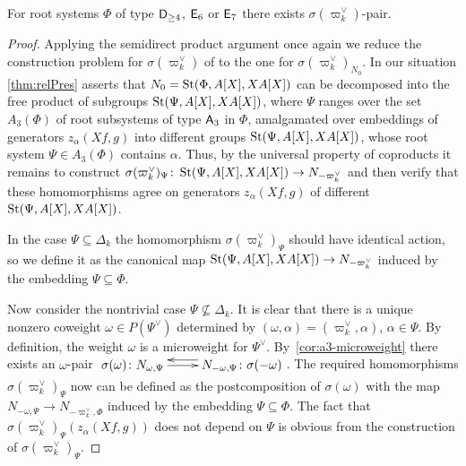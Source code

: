 \begin{thm}
    For root systems $\Phi$ of type $\mathsf{D}_{\geq 4}$, $\mathsf{E}_6$ or $\mathsf{E}_7$ there exists $\sigma(\varpi_k^\vee)$-pair.
\end{thm}
\begin{proof}
    Applying the semidirect product argument once again we reduce the construction problem for $\sigma(\varpi_k^\vee)$ of to the one for $\sigma({\varpi_k^\vee})_{N_0}$.
    In our situation \cref{thm:relPres} asserts that $N_0 = \operatorname{St}(\Phi, A[X], XA[X])$ can be decomposed into the free product of subgroups $\operatorname{St}(\Psi, A[X], XA[X])$,
    where $\Psi$ ranges over the set $A_3(\Phi)$ of root subsystems of type $\mathsf{A}_3$ in $\Phi$, amalgamated over embeddings of generators $z_\alpha(Xf, g)$ into different groups $\operatorname{St}(\Psi, A[X], XA[X])$, whose root system $\Psi \in A_3(\Phi)$ contains $\alpha$.
    Thus, by the universal property of coproducts it remains to construct $\sigma(\varpi_k^\vee)_\Psi \colon \operatorname{St}(\Psi, A[X], XA[X]) \to N_{-\varpi_k^\vee}$ and then
    verify that these homomorphisms agree on generators $z_\alpha(Xf, g)$ of different $\operatorname{St}(\Psi, A[X], XA[X])$.

    In the case $\Psi \subseteq \Delta_k$ the homomorphism $\sigma(\varpi_k^\vee)_\Psi$ should have identical action, so we define it as the canonical map $\operatorname{St}(\Psi, A[X], XA[X]) \to N_{-\varpi_k^\vee}$
    induced by the embedding $\Psi \subseteq \Phi$.

    Now consider the nontrivial case $\Psi \not\subseteq \Delta_k$.
    It is clear that there is a unique nonzero coweight $\omega \in P(\Psi^\vee)$ determined by $(\omega, \alpha) = (\varpi_k^\vee, \alpha)$, $\alpha \in \Psi$.
    By definition, the weight $\omega$ is a microweight for $\Psi^\vee$.
    By~\cref{cor:a3-microweight} there exists an $\omega$-pair $\xymatrix{ \sigma(\omega)\colon N_{\omega, \Psi} \ar[r] & \ar@<-1.0ex>[l] N_{-\omega, \Psi}\colon \sigma(-\omega) }$.
    The required homomorphisms $\sigma(\varpi_k^\vee)_\Psi$ now can be defined as the postcomposition of $\sigma(\omega)$ with the map $N_{-\omega, \Psi} \to N_{-\varpi_k^\vee, \Phi}$ induced by the embedding $\Psi \subseteq \Phi$.
    The fact that $\sigma(\varpi_k^\vee)_\Psi(z_\alpha(Xf, g))$ does not depend on $\Psi$ is obvious from the construction of $\sigma(\varpi_k^\vee)_\Psi$.
\end{proof}